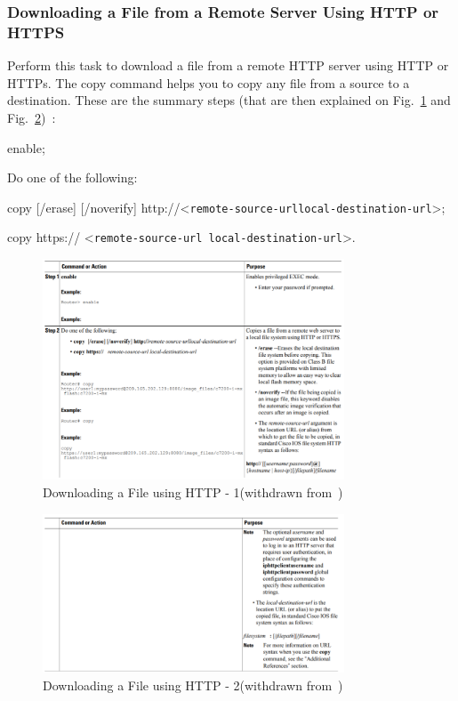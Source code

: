 \subsubsection{Downloading a File from a Remote Server Using HTTP or HTTPS}
Perform this task to download a file from a remote HTTP server using HTTP or HTTPs. The copy command helps you to copy any file from a source to a destination. These are the summary steps (that are then explained on Fig.~\ref{fig:download-http-1} and Fig.~\ref{fig:download-http-2})~\cite{http-example-cisco}:
%
\begin{enum-c}
\item enable;
\item Do one of the following:
	\begin{item-c}
	\item copy [/erase] [/noverify] http://<\texttt{remote-source-urllocal-destination-url}>;
	\item copy https:// <\texttt{remote-source-url local-destination-url}>.
	\end{item-c}
\end{enum-c}
%
\begin{figure}[!hbt]
\centering
    \includegraphics[width=0.8\textwidth]{./img/download-http-1.png}
  \caption{Downloading a File using HTTP - 1(withdrawn from~\cite{http-example-cisco})}%
\label{fig:download-http-1}
\end{figure}
%
\begin{figure}[!hbt]
\centering
    \includegraphics[width=0.8\textwidth]{./img/download-http-2.png}
  \caption{Downloading a File using HTTP - 2(withdrawn from~\cite{http-example-cisco})}%
\label{fig:download-http-2}
\end{figure}


